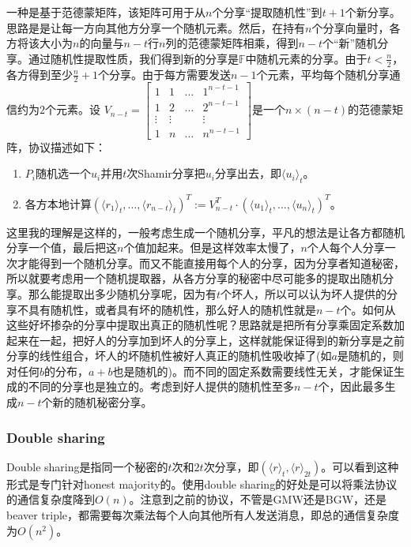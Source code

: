 \documentclass[UTF8]{ctexart}
\theoremstyle{nonumberplain}
\theoremstyle{plain}
\begin{document}
一种是基于范德蒙矩阵\cite{DBLP:conf/crypto/DamgardN07}，该矩阵可用于从$n$个分享“提取随机性”到$t+1$个新分享。思路是是让每一方向其他方分享一个随机元素。然后，在持有$n$个分享向量时，各方将该大小为$n$的向量与$n-t$行$n$列的范德蒙矩阵相乘，得到$n-t$个“新”随机分享。通过随机性提取性质，我们得到新的分享是$\mathbb{F}$中随机元素的分享。由于$t<\frac{n}{2}$，各方得到至少$\frac{n}{2}+1$个分享。由于每方需要发送$n-1$个元素，平均每个随机分享通信约为$2$个元素。设{ $V_{n-t}=\left[ \begin{array}{cccc}
	     1&1&\dots&1^{n-t-1}  \\
	     1&2&\dots&2^{n-t-1}  \\
	     \vdots&\vdots&&\vdots  \\
	     1&n&\dots&n^{n-t-1}  
		\end{array}
		\right ]$}是一个$n\times (n-t)$的范德蒙矩阵，协议描述如下：
\begin{enumerate}
\item $P_i$随机选一个$u_i$并用$t$次Shamir分享把$u_i$分享出去，即$\langle u_i\rangle_t$。
\item 各方本地计算$(\langle r_1\rangle_t,\dots,\langle r_{n-t}\rangle_t)^T:=V_{n-t}^T\cdot (\langle u_1\rangle_t,\dots,\langle u_n\rangle_t)^T$。
\end{enumerate}
这里我的理解是这样的，一般考虑生成一个随机分享，平凡的想法是让各方都随机分享一个值，最后把这$n$个值加起来。但是这样效率太慢了，$n$个人每个人分享一次才能得到一个随机分享。而又不能直接用每个人的分享，因为分享者知道秘密，所以就要考虑用一个随机提取器，从各方分享的秘密中尽可能多的提取出随机分享。那么能提取出多少随机分享呢，因为有$t$个坏人，所以可以认为坏人提供的分享不具有随机性，或者具有坏的随机性，那么好人的随机性就是$n-t$个。如何从这些好坏掺杂的分享中提取出真正的随机性呢？思路就是把所有分享乘固定系数加起来在一起，把好人的分享加到坏人的分享上，这样就能保证得到的新分享是之前分享的线性组合，坏人的坏随机性被好人真正的随机性吸收掉了(如$a$是随机的，则对任何$b$的分布，$a+b$也是随机的)。而不同的固定系数需要线性无关，才能保证生成的不同的分享也是独立的。考虑到好人提供的随机性至多$n-t$个，因此最多生成$n-t$个新的随机秘密分享。
\subsubsection{Double sharing}
Double sharing\cite{DBLP:conf/crypto/DamgardN07}是指同一个秘密的$t$次和$2t$次分享，即$(\langle r\rangle_t,\langle r\rangle_{2t})$。可以看到这种形式是专门针对honest majority的。使用double sharing的好处是可以将乘法协议的通信复杂度降到$O(n)$。注意到之前的协议，不管是GMW还是BGW，还是beaver triple，都需要每次乘法每个人向其他所有人发送消息，即总的通信复杂度为$O(n^2)$。
\end{document}
